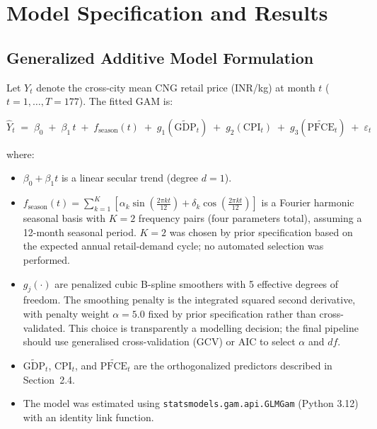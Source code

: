 \documentclass[11pt,a4paper]{article}
\begin{document}


\section{Model Specification and Results}
\label{sec:results}

\subsection{Generalized Additive Model Formulation}

Let $Y_t$ denote the cross-city mean CNG retail price (INR/kg) at month $t$
($t = 1, \ldots, T = 177$).  The fitted GAM is:

\begin{equation}
\hat{Y}_t \;=\; \beta_0 \;+\; \beta_1\, t \;+\; f_{\mathrm{season}}(t)
            \;+\; g_1\!\left(\widetilde{\mathrm{GDP}}_t\right)
            \;+\; g_2\!\left(\mathrm{CPI}_t\right)
            \;+\; g_3\!\left(\widetilde{\mathrm{PFCE}}_t\right)
            \;+\; \varepsilon_t
\label{eq:gam}
\end{equation}

\noindent where:
\begin{itemize}
  \item $\beta_0 + \beta_1 t$ is a linear secular trend (degree $d=1$).
  \item $f_{\mathrm{season}}(t) = \sum_{k=1}^{K}\!\left[\alpha_k\sin\!\left(\tfrac{2\pi k t}{12}\right) + \delta_k\cos\!\left(\tfrac{2\pi k t}{12}\right)\right]$
        is a Fourier harmonic seasonal basis with $K=2$ frequency pairs
        (four parameters total), assuming a 12-month seasonal period.
        $K=2$ was chosen by prior specification based on the expected
        annual retail-demand cycle; no automated selection was performed.
  \item $g_j(\cdot)$ are penalized cubic B-spline smoothers with 5 effective
        degrees of freedom.  The smoothing penalty is the integrated squared
        second derivative, with penalty weight $\alpha = 5.0$ fixed by
        prior specification rather than cross-validated.  This choice is
        transparently a modelling decision; the final pipeline should use
        generalised cross-validation (GCV) or AIC to select $\alpha$ and $df$.
  \item $\widetilde{\mathrm{GDP}}_t$, $\mathrm{CPI}_t$, and
        $\widetilde{\mathrm{PFCE}}_t$ are the orthogonalized predictors
        described in Section~2.4.
  \item The model was estimated using \texttt{statsmodels.gam.api.GLMGam}
        (Python 3.12) with an identity link function.
\end{itemize}
\end{document}
